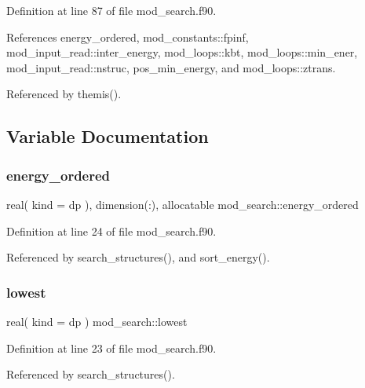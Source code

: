 Definition at line 87 of file mod\+\_\+search.\+f90.



References energy\+\_\+ordered, mod\+\_\+constants\+::fpinf, mod\+\_\+input\+\_\+read\+::inter\+\_\+energy, mod\+\_\+loops\+::kbt, mod\+\_\+loops\+::min\+\_\+ener, mod\+\_\+input\+\_\+read\+::nstruc, pos\+\_\+min\+\_\+energy, and mod\+\_\+loops\+::ztrans.



Referenced by themis().



\subsection{Variable Documentation}
\mbox{\label{namespacemod__search_a8ce72764a5658f7958ed5c473dd77706}} 
\subsubsection{\texorpdfstring{energy\+\_\+ordered}{energy\_ordered}}
{\footnotesize\ttfamily real( kind = dp ), dimension(\+:), allocatable mod\+\_\+search\+::energy\+\_\+ordered}



Definition at line 24 of file mod\+\_\+search.\+f90.



Referenced by search\+\_\+structures(), and sort\+\_\+energy().

\mbox{\label{namespacemod__search_a014567a8f5474b311cedf2f9b1dbda1a}} 
\subsubsection{\texorpdfstring{lowest}{lowest}}
{\footnotesize\ttfamily real( kind = dp ) mod\+\_\+search\+::lowest}



Definition at line 23 of file mod\+\_\+search.\+f90.



Referenced by search\+\_\+structures().

\mbox{\label{namespacemod__search_a0c7388c12d8e6a95b8c3f9fd86321687}} 

